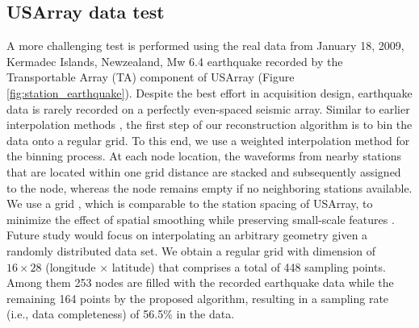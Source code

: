 \subsection*{USArray data test} A more challenging test is performed using the real data from January 18, 2009, Kermadec Islands, Newzealand, Mw 6.4 earthquake recorded by the Transportable Array (TA) component of USArray (Figure \ref{fig:station_earthquake}). Despite the best effort in acquisition design, earthquake data is rarely recorded on a perfectly even-spaced seismic array. Similar to earlier  interpolation methods \cite[]{neal1999imaging,dokht2016singular,schneider2017improvement}, the first step of our reconstruction algorithm is to bin the data onto a regular grid. To this end, we use a weighted interpolation method for the binning process. At each node location, the waveforms from nearby stations that are located within one grid distance are stacked and subsequently assigned to the node, whereas the node remains empty if no neighboring stations  available.  We use a grid , which is comparable to the station spacing of USArray, to minimize the effect of spatial smoothing while preserving small-scale features . Future study would focus on interpolating an arbitrary geometry given a randomly distributed data set.  We obtain a regular grid with  dimension of $16\times 28$ (longitude $\times$  latitude) that comprises a total of 448 sampling points.  Among them 253 nodes are filled with the recorded earthquake data while the remaining 164 points  by the proposed algorithm, resulting in a sampling rate (i.e., data completeness) of 56.5\% in the data.



